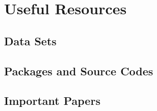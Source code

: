 \documentclass{book}
\begin{document}


\chapter{Useful Resources}
\section{Data Sets}
\section{Packages and Source Codes}
\section{Important Papers}
\end{document}
